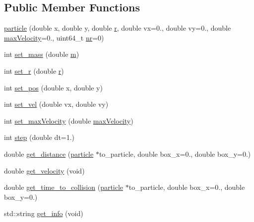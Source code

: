 \subsection*{Public Member Functions}
\begin{DoxyCompactItemize}
\item 
\mbox{\hyperlink{structparticle_a747b2142fefd6da08d95d84b32d985c5}{particle}} (double x, double y, double \mbox{\hyperlink{structparticle_a9ba64d6fa0d4bda34688d54a05341b77}{r}}, double vx=0., double vy=0., double \mbox{\hyperlink{structparticle_a2ea1a35ec678df5cc776dfd6bd377fad}{max\+Velocity}}=0., uint64\+\_\+t \mbox{\hyperlink{structparticle_a055d478842e85c5f730fc75f16254852}{nr}}=0)
\item 
int \mbox{\hyperlink{structparticle_af0c523c22c7b51a1a932f5f3f30b24a3}{set\+\_\+mass}} (double \mbox{\hyperlink{structparticle_a4cb4f184e6cd2b5dc0dc555d14f265dd}{m}})
\item 
int \mbox{\hyperlink{structparticle_ad45d7067a63de0b6c6ce07723a8e7be2}{set\+\_\+r}} (double \mbox{\hyperlink{structparticle_a9ba64d6fa0d4bda34688d54a05341b77}{r}})
\item 
int \mbox{\hyperlink{structparticle_a1088eb89ce4d29bc645160b91ba328c3}{set\+\_\+pos}} (double x, double y)
\item 
int \mbox{\hyperlink{structparticle_aafcf36063e5b6b0719b7ee8377f3c880}{set\+\_\+vel}} (double vx, double vy)
\item 
int \mbox{\hyperlink{structparticle_a842a75343ebbcdcaf53e95f0f1286d9a}{set\+\_\+max\+Velocity}} (double \mbox{\hyperlink{structparticle_a2ea1a35ec678df5cc776dfd6bd377fad}{max\+Velocity}})
\item 
int \mbox{\hyperlink{structparticle_a4f06bd4316643ca9ba721a4f768763a6}{step}} (double dt=1.)
\item 
double \mbox{\hyperlink{structparticle_ab28d2ff9718bfa0fb801275d90f36a9d}{get\+\_\+distance}} (\mbox{\hyperlink{structparticle}{particle}} $\ast$to\+\_\+particle, double box\+\_\+x=0., double box\+\_\+y=0.)
\item 
double \mbox{\hyperlink{structparticle_a8ca7119317b6176296ba0e4a0734ee33}{get\+\_\+velocity}} (void)
\item 
double \mbox{\hyperlink{structparticle_a8075edc35cef018e8d5fabcce3bc099e}{get\+\_\+time\+\_\+to\+\_\+collision}} (\mbox{\hyperlink{structparticle}{particle}} $\ast$to\+\_\+particle, double box\+\_\+x=0., double box\+\_\+y=0.)
\item 
std\+::string \mbox{\hyperlink{structparticle_a74457d580da5637e77c1d72ba7a31bb5}{get\+\_\+info}} (void)
\end{DoxyCompactItemize}
